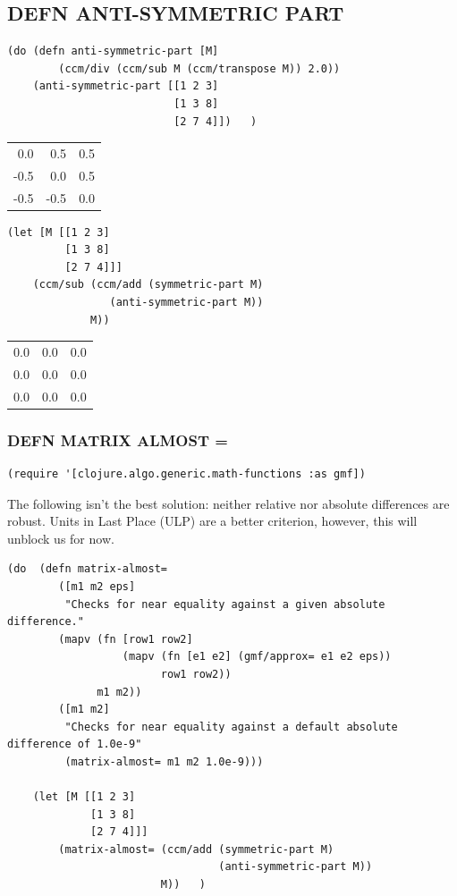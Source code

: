 \documentclass[10pt,oneside,x11names]{article}
\begin{document}
\subsection{DEFN ANTI-SYMMETRIC PART}
\label{sec:org0d33e2f}

\begin{verbatim}
(do (defn anti-symmetric-part [M]
        (ccm/div (ccm/sub M (ccm/transpose M)) 2.0))
    (anti-symmetric-part [[1 2 3]
                          [1 3 8]
                          [2 7 4]])   )
\end{verbatim}

\begin{center}
\begin{tabular}{rrr}
0.0 & 0.5 & 0.5\\
-0.5 & 0.0 & 0.5\\
-0.5 & -0.5 & 0.0\\
\end{tabular}
\end{center}

\begin{verbatim}
(let [M [[1 2 3]
         [1 3 8]
         [2 7 4]]]
    (ccm/sub (ccm/add (symmetric-part M)
                (anti-symmetric-part M))
             M))
\end{verbatim}

\begin{center}
\begin{tabular}{rrr}
0.0 & 0.0 & 0.0\\
0.0 & 0.0 & 0.0\\
0.0 & 0.0 & 0.0\\
\end{tabular}
\end{center}

\subsubsection{DEFN MATRIX ALMOST =}
\label{near-equality-for-matrices}
\begin{verbatim}
(require '[clojure.algo.generic.math-functions :as gmf])
\end{verbatim}

The following isn't the best solution: neither relative nor absolute differences
are robust. Units in Last Place (ULP) are a better criterion, however, this will
unblock us for now.

\begin{verbatim}
(do  (defn matrix-almost=
        ([m1 m2 eps]
         "Checks for near equality against a given absolute difference."
        (mapv (fn [row1 row2]
                  (mapv (fn [e1 e2] (gmf/approx= e1 e2 eps))
                        row1 row2))
              m1 m2))
        ([m1 m2]
         "Checks for near equality against a default absolute difference of 1.0e-9"
         (matrix-almost= m1 m2 1.0e-9)))

    (let [M [[1 2 3]
             [1 3 8]
             [2 7 4]]]
        (matrix-almost= (ccm/add (symmetric-part M)
                                 (anti-symmetric-part M))
                        M))   )
\end{verbatim}
\end{document}
